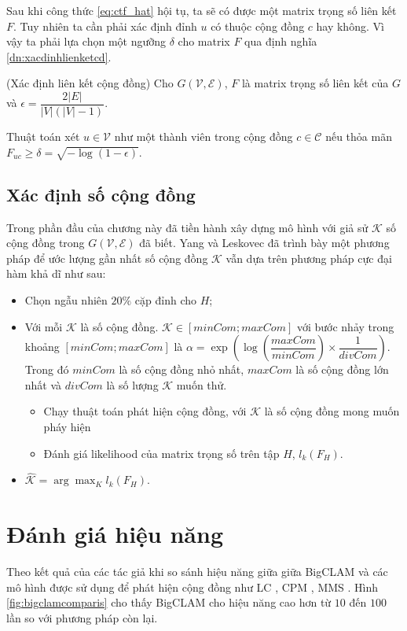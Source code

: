 Sau khi công thức \ref{eq:ctf_hat} hội tụ, ta sẽ có được một matrix trọng số liên kết $F$. Tuy nhiên ta cần phải xác định đỉnh $u$ có thuộc cộng đồng $c$ hay không. Vì vậy ta phải lựa chọn một ngưỡng $\delta$ cho matrix $F$ qua định nghĩa \ref{dn:xacdinhlienketcd}.
\begin{definition}(Xác định liên kết cộng đồng) \label{dn:xacdinhlienketcd}
	Cho $G(\mathcal{V},\mathcal{E})$, $F$ là matrix trọng số liên kết của $G$ và $\epsilon = \dfrac{2|E|}{|V|(|V| - 1)}$.
	
	Thuật toán xét $u \in \mathcal{V}$ như một thành viên trong cộng đồng $c\in \mathcal{C}$ nếu thỏa mãn $F_{uc}\geq \delta = \sqrt{-\log(1-\epsilon)}$.
\end{definition}

\subsection{Xác định số cộng đồng}
Trong phần đầu của chương này đã tiền hành xây dựng mô hình với giả sử $\mathcal{K}$ số cộng đồng trong $G(\mathcal{V},\mathcal{E})$ đã biết. Yang và Leskovec đã trình bày một phương pháp để ước lượng gần nhất số cộng đồng $\mathcal{K}$ vẫn dựa trên phương pháp cực đại hàm khả dĩ như sau:
\begin{itemize}
	\item Chọn ngẫu nhiên $20\%$ cặp đỉnh cho $H$;
	\item Với mỗi $\mathcal{K}$ là số cộng đồng. $\mathcal{K} \in [minCom;maxCom]$ với bước nhảy trong khoảng $[minCom; maxCom]$ là $\alpha = \exp{\left(\log{\left(\dfrac{maxCom}{minCom}\right)}\times\dfrac{1}{divCom}\right)}$. Trong đó $minCom$ là số cộng đồng nhỏ nhất, $maxCom$ là số cộng đồng lớn nhất và $divCom$ là số lượng $\mathcal{K}$ muốn thử.
	\begin{itemize}
			\item Chạy thuật toán phát hiện cộng đồng, với $\mathcal{K}$ là số cộng đồng mong muốn pháy hiện
			\item Đánh giá likelihood của matrix trọng số trên tập $H$, $l_k{(F_H)}$.
		\end{itemize}
	\item $\hat{\mathcal{K}} = \arg \max_K l_k{(F_H)}$.
\end{itemize} 

\section{Đánh giá hiệu năng}
Theo kết quả của các tác giả khi so sánh hiệu năng  giữa giữa BigCLAM và các mô hình được sử dụng để phát hiện cộng đồng như LC \cite{ahn2010link}, CPM \cite{palla2005uncovering}, MMS \cite{airoldi2008mixed}. Hình \ref{fig:bigclamcomparis} cho thấy BigCLAM cho hiệu năng cao hơn từ $10$ đến $100$ lần so với phương pháp còn lại. 


